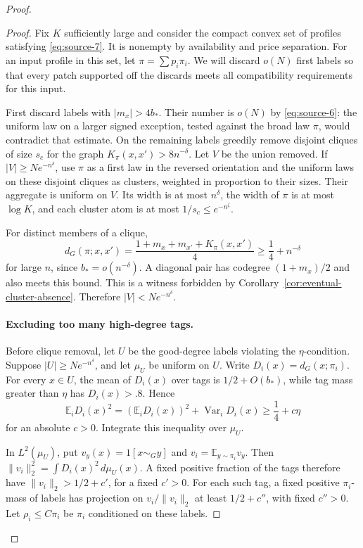 \begin{proof}
\begin{proof}
Fix \(K\) sufficiently large and consider the compact convex set of profiles satisfying \eqref{eq:source-7}. It is nonempty by availability and price separation. For an input profile in this set, let \(\pi=\sum p_i\pi_i\). We will discard \(o(N)\) first labels so that every patch supported off the discards meets all compatibility requirements for this input.

First discard labels with \(|m_x|>4b_*\). Their number is \(o(N)\) by \eqref{eq:source-6}: the uniform law on a larger signed exception, tested against the broad law \(\pi\), would contradict that estimate. On the remaining labels greedily remove disjoint cliques of size \(s_c\) for the graph \(K_\pi(x,x')>8n^{-\delta}\). Let \(V\) be the union removed. If \(|V|\ge Ne^{-n^\delta}\), use \(\pi\) as a first law in the reversed orientation and the uniform laws on these disjoint cliques as clusters, weighted in proportion to their sizes. Their aggregate is uniform on \(V\). Its width is at most \(n^\delta\), the width of \(\pi\) is at most \(\log K\), and each cluster atom is at most \(1/s_c\le e^{-n^\zeta}\).

For distinct members of a clique,
\[
 d_G(\pi;x,x')
   =\frac{1+m_x+m_{x'}+K_\pi(x,x')}{4}
   \ge\frac14+n^{-\delta}
\]
for large \(n\), since \(b_*=o(n^{-\delta})\). A diagonal pair has codegree \((1+m_x)/2\) and also meets this bound. This is a witness forbidden by Corollary~\ref{cor:eventual-cluster-absence}. Therefore \(|V|<Ne^{-n^\delta}\).

\paragraph{Excluding too many high-degree tags.}
Before clique removal, let \(U\) be the good-degree labels violating the \(\eta\)-condition. Suppose \(|U|\ge Ne^{-n^\delta}\), and let \(\mu_U\) be uniform on \(U\). Write \(D_i(x)=d_G(x;\pi_i)\). For every \(x\in U\), the mean of \(D_i(x)\) over tags is \(1/2+O(b_*)\), while tag mass greater than \(\eta\) has \(D_i(x)>.8\). Hence
\[
 \mathbb E_iD_i(x)^2
   =(\mathbb E_iD_i(x))^2+\operatorname{Var}_iD_i(x)
   \ge\frac14+c\eta
\]
for an absolute \(c>0\). Integrate this inequality over \(\mu_U\).

In \(L^2(\mu_U)\), put \(v_y(x)=1[x\sim_G y]\) and \(v_i=\mathbb E_{y\sim\pi_i}v_y\). Then
\(\|v_i\|_2^2=\int D_i(x)^2\,d\mu_U(x)\).
A fixed positive fraction of the tags therefore have \(\|v_i\|_2>1/2+c'\), for a fixed \(c'>0\). For each such tag, a fixed positive \(\pi_i\)-mass of labels has projection on \(v_i/\|v_i\|_2\) at least \(1/2+c''\), with fixed \(c''>0\). Let \(\rho_i\le C\pi_i\) be \(\pi_i\) conditioned on these labels.


\end{proof}
\end{proof}
